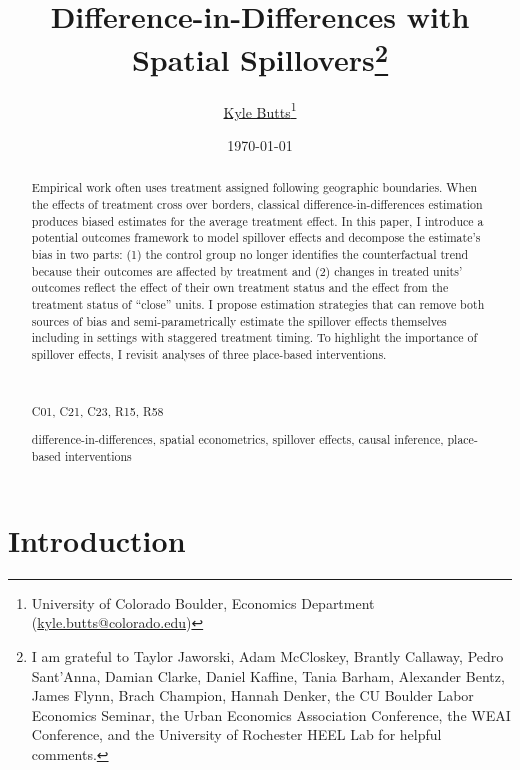 \documentclass[11pt]{article}
\title{Difference-in-Differences with Spatial Spillovers\thanks{I am grateful to Taylor Jaworski, Adam McCloskey, Brantly Callaway, Pedro Sant'Anna, Damian Clarke, Daniel Kaffine, Tania Barham, Alexander Bentz, James Flynn, Brach Champion, Hannah Denker, the CU Boulder Labor Economics Seminar, the Urban Economics Association Conference, the WEAI Conference, and the University of Rochester HEEL Lab for helpful comments.}}
\author{\href{https://kylebutts.com/}{Kyle Butts}\thanks{University of Colorado Boulder, Economics Department (\href{mailto:kyle.butts@colorado.edu}{kyle.butts@colorado.edu})}}
\date{\today}
\begin{document}
\begin{titlepage}
    \maketitle

    \begin{abstract}
        {\small
        Empirical work often uses treatment assigned following geographic boundaries. When the effects of treatment cross over borders, classical difference-in-differences estimation produces biased estimates for the average treatment effect. In this paper, I introduce a potential outcomes framework to model spillover effects and decompose the estimate's bias in two parts: (1) the control group no longer identifies the counterfactual trend because their outcomes are affected by treatment and (2) changes in treated units' outcomes reflect the effect of their own treatment status and the effect from the treatment status of ``close'' units. I propose estimation strategies that can remove both sources of bias and semi-parametrically estimate the spillover effects themselves including in settings with staggered treatment timing. To highlight the importance of spillover effects, I revisit analyses of three place-based interventions.
    
        \par~\par\noindent
         C01, C21, C23, R15, R58
        \par
         difference-in-differences, spatial econometrics, spillover effects, causal inference, place-based interventions
        \par\vspace{-2.5mm}
        }
    \end{abstract}
\end{titlepage}



\section{Introduction}
\end{document}
